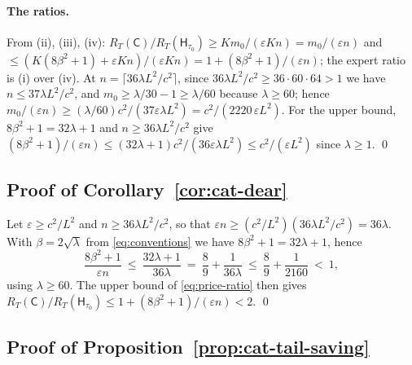 \documentclass{article}
\theoremstyle{definition}
\theoremstyle{remark}
\newcommand{\eps}{\varepsilon}
\theoremstyle{remark}
\newcommand{\Cold}{\mathsf{C}}
\newcommand{\Hyb}{\mathsf{H}}
\begin{document}
\paragraph{The ratios.}
From (ii), (iii), (iv): $R_T(\Cold)/R_T(\Hyb_{\tau_0})\ge Km_0/(\eps Kn)=m_0/(\eps n)$
and $\le(K(8\beta^2+1)+\eps Kn)/(\eps Kn)=1+(8\beta^2+1)/(\eps n)$; the
expert ratio is (i) over (iv). At $n=\lceil36\lambda L^2/c^2\rceil$, since
$36\lambda L^2/c^2\ge36\cdot60\cdot64>1$ we have $n\le37\lambda L^2/c^2$, and
$m_0\ge\lambda/30-1\ge\lambda/60$ because $\lambda\ge60$; hence
$m_0/(\eps n)\ge(\lambda/60)c^2/(37\eps\lambda L^2)=c^2/(2220\,\eps L^2)$. For the
upper bound, $8\beta^2+1=32\lambda+1$ and $n\ge36\lambda L^2/c^2$ give
$(8\beta^2+1)/(\eps n)\le(32\lambda+1)c^2/(36\eps\lambda L^2)\le c^2/(\eps L^2)$
since $\lambda\ge1$. \qed

\subsection{Proof of Corollary~\ref{cor:cat-dear}}

Let $\eps\ge c^2/L^2$ and $n\ge36\lambda L^2/c^2$, so that
$\eps n\ge(c^2/L^2)(36\lambda L^2/c^2)=36\lambda$. With $\beta=2\sqrt\lambda$
from \eqref{eq:conventions} we have $8\beta^2+1=32\lambda+1$, hence
\[
\frac{8\beta^2+1}{\eps n}\ \le\ \frac{32\lambda+1}{36\lambda}
\ =\ \frac89+\frac{1}{36\lambda}\ \le\ \frac89+\frac{1}{2160}\ <\ 1 ,
\]
using $\lambda\ge60$. The upper bound of \eqref{eq:price-ratio} then gives
$R_T(\Cold)/R_T(\Hyb_{\tau_0})\le1+(8\beta^2+1)/(\eps n)<2$. \qed

\subsection{Proof of Proposition~\ref{prop:cat-tail-saving}}
\label{app:proof-tail-saving}
\end{document}
